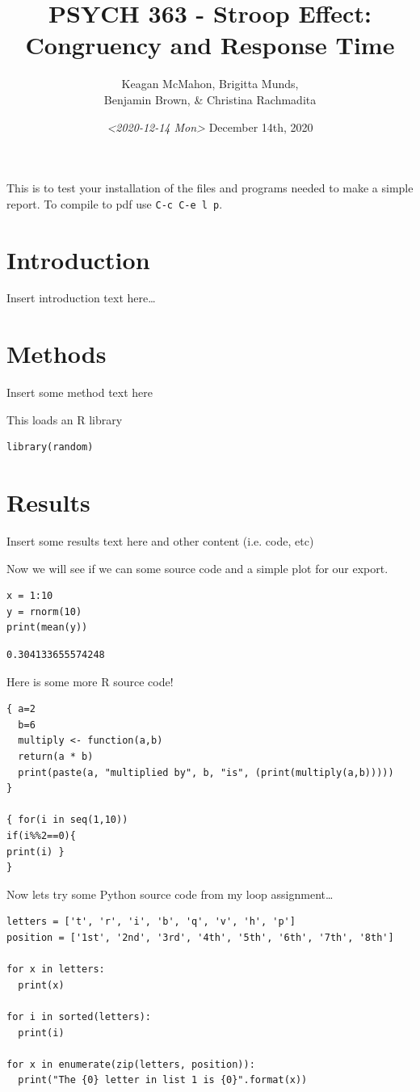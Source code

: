 \documentclass{article}
\author{Keagan McMahon, Brigitta Munds, \\ Benjamin Brown, \& Christina Rachmadita}
\date{\textit{<2020-12-14 Mon>} December 14th, 2020}
\title{PSYCH 363 - Stroop Effect: Congruency and Response Time}
\begin{document}
\maketitle
\tableofcontents

This is to test your installation of the files and programs needed to make a simple report. To compile to pdf use \texttt{C-c C-e l p}.

\section{Introduction}
\label{sec:orgbdc3519}

Insert introduction text here\ldots{}


\section{Methods}
\label{sec:org22ebc97}

Insert some method text here

This loads an R library
\begin{verbatim}
library(random)
\end{verbatim}


\section{Results}
\label{sec:org49a52bf}

Insert some results text here and other content (i.e. code, etc)

Now we will see if we can some source code and a simple plot for our export.

\begin{verbatim}
x = 1:10
y = rnorm(10)
print(mean(y))
\end{verbatim}

\begin{verbatim}
0.304133655574248
\end{verbatim}

Here is some more R source code!
\begin{verbatim}
{ a=2
  b=6
  multiply <- function(a,b)
  return(a * b)
  print(paste(a, "multiplied by", b, "is", (print(multiply(a,b)))))
}

{ for(i in seq(1,10))
if(i%%2==0){ 
print(i) }
}
\end{verbatim}

Now lets try some Python source code from my loop assignment\ldots{}

\begin{verbatim}
letters = ['t', 'r', 'i', 'b', 'q', 'v', 'h', 'p']
position = ['1st', '2nd', '3rd', '4th', '5th', '6th', '7th', '8th']

for x in letters:
  print(x)

for i in sorted(letters):
  print(i)

for x in enumerate(zip(letters, position)):
  print("The {0} letter in list 1 is {0}".format(x))

\end{verbatim}
\end{document}
